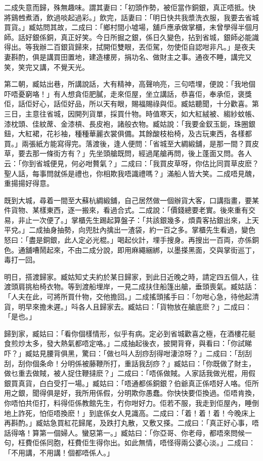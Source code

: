\documentclass[a5paper, 12pt, openany]{book} %
\begin{document}
	二成失意而歸，殊無趣味。謂其妻曰：「初頭作勢，被佢當作銅銀，真正唔抵。快將鷄乸煮酒，飲過啖起過彩。」飲完，話妻曰：「明日快共我漿洗衣服，我要去省城買貨。」臧姑問其故，二成曰：「鄉村間小墟場，舖戶應承做掌櫃，未曾學得半個月師。話好銀係銅，真正好笑。今日所掘之銀，係日久變色，拈到省城，銀師必能識得出。等我辦二百銀貨歸來，拭開佢雙眼，丟佢駕，勿使佢自認咁非凡。」是夜夫妻斟酌，俱是講買田置地，建造樓房，捐功名、做財主之事。通夜不睡，講完又笑，笑完又講，不覺天光。

	第二朝，臧姑出巷，所講說話，大有精神，高聲响亮，三句唔埋，便說：「我地個吓唔憂窮咯！」有人想貪佢肥膩，走來佢屋，坐立講話，恭喜佢，奉承佢，褒獎佢，話佢好心，話佢好品，所以天有眼，賜福賜祿與佢。臧姑聽聞，十分歡喜。第三日，主意往省城，因開列貨單，採買什物。時值寒天，如大紅絨被、縐紗蚊帳、漆枕頭、佳紋蓆、金漆槓、長皮袍，諸般衣物。臧姑說：「我要金釵玉鈪，珠圈銀鈕，大紅裙，花衫袖，種種華麗衣裳俱備。其餘酸枝枱椅，及古玩東西，各樣都買。」兩張紙方能寫得完。落渡後，逢人便問：「省城至大綢緞舖，是那一間？買皮草，要去那一條街方有？」先坐頭艙既問，經過尾艙再問，後上蓬面又問。各人云：「你到省城便見，何必咁贅氣？」二成曰：「我買皮草呀，你估比同買草皮麽？聖人話，每事問就係是禮也，你相欺我唔識禮嗎？」滿船人皆大笑。二成唔見醜，重揚揚好得意。

	既到大城，尋着一間至大蘇杭綢緞舖，自己居然做一個辦貨大客，口講指畫，要某件貨物、某樣東西，逐一搬來，看過合式。二成說：「價錢總要老實。後來重有交易，非止一次便了。」掌櫃先生踢起算盤子：「共該銀幾多，煩貴客拈銀出來，上天平兌。」二成抽身抽勢，向兜肚內擒出一渣袋，約一百之多。掌櫃先生看過，變色怒曰：「盡是銅銀，此人定必光棍。」喝起伙計，埋手搜身。再搜出一百両，亦係銅色。通舖嘈鬧起來，不由二成分說，即用麻繩綑綁，以墨搽黑面，交與掌街巡丁，毒打一回。

	明日，搭渡歸家。臧姑知丈夫約於某日歸家，到此日近晚之時，請定四五個人，往渡頭肩挑枱椅衣物。等到渡船埋岸，一見二成扶住船篷出艙，垂頭喪氣。臧姑話：「人夫在此，可將所買什物，交他擔回。」二成搖頭搖手曰：「勿咁心急，待他起清貨，明早來擔未遲。」呌各人且歸家去。臧姑曰：「貨物放在艙底麽？」二成曰：「是也。」

	歸到家，臧姑曰：「看你個樣情形，似乎有病。定必到省城歡喜之極，在酒樓花艇食煎炒太多，發大熱氣都唔定咯。」二成抽起後衣，披開背脊，與看曰：「你試睇吓？」臧姑見腰背俱黑，驚曰：「做乜呌人刮痧刮得咁淒涼呀？」二成曰：「刮刮刮，刮你個条命！分明係被藤鞭所打，重話我刮痧？」臧姑曰：「你既做了財主，做乜重去做賊，被人捉住鞭撻麽？」二成曰：「唔係做賊。人家話我做光棍，用假銀買真貨，白白受打一場。」臧姑曰：「唔通都係銅銀？伯爺真正係唔好人咯。佢所用之銀，聞得俱是好，我所用係假，分明欺你愚蠢。你快快要佢換過。佢唔肯換，你唔怕共佢打，料得佢係教館先生，冇你咁好力。佢若不服，我走到佢屋內，睡倒地上詐死，怕佢唔換麽！」到底係女人見識高。二成曰：「着！着！着！今晚床上再斟酌。」臧姑急買紅花歸尾，及跌打丸散，又敷又搽。二成曰：「真正好心事，唔話得咯！算第一個婦人。蠻惡第一。」臧姑曰：「你亞哥、你老母，都唔來問候一句，枉費佢係同胞，枉費佢生得你出。如此無情，唔怪得兩公婆心淡。」二成曰：「不用講，不用講！個都唔係人。」
\end{document}
